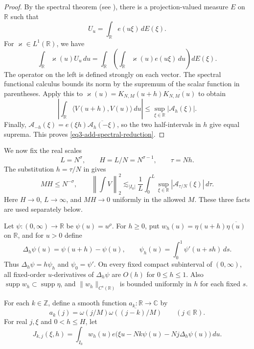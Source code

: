 \documentclass[reqno,12pt]{amsart}
\def \C {\mathbb C}
\def \Z {\mathbb Z}
\def \R {\mathbb R}
\def \Q {\mathbb Q}
\numberwithin{equation}{section}
\begin{document}
\begin{proof}
By the spectral theorem (see \cite[Theorem~4.45]{Folland2016}), there is a
projection-valued measure $E$ on $\R$ such that
$$U_u=\int_\R e(u\xi)\,dE(\xi).$$ For $\varkappa\in L^1(\R)$, we have
\[
 \int_\R\varkappa(u)U_u\,du
 =\int_\R\left(\int_\R\varkappa(u)e(u\xi)\,du\right)dE(\xi).
\]
The operator on the left is defined strongly on each vector. The
spectral functional calculus bounds its norm by the supremum of the
scalar function in parentheses. Apply this to
$\varkappa(u)=K_{N,M}(u+h)\overline{K_{N,M}(u)}$ to obtain
\[
 \left|\int_\R\langle V(u+h),V(u)\rangle\,du\right|
 \le\sup_{\xi\in\R}|\mathcal A_h(\xi)|.
\]
Finally,
$\mathcal A_{-h}(\xi)=e(\xi h)\overline{\mathcal A_h(-\xi)}$,
so the two half-intervals in $h$ give equal suprema.
This proves \eqref{eq3-add-spectral-reduction}.
\end{proof}

We now fix the real scales
\begin{equation}
 L=N^\sigma,\qquad H=L/N=N^{\sigma-1},\qquad \tau=Nh.
 \label{eq3-add-shift-scales}
\end{equation}
The substitution $h=\tau/N$ in  gives
\begin{equation}
 MH\le N^{-\sigma},\qquad
 \left\|\int V\right\|_2^2
 \lesssim_{|I_0|}\frac1L\int_0^L
       \sup_{\xi\in\R}|\mathcal A_{\tau/N}(\xi)|\,d\tau.
 \label{eq3-add-dual-time-reduction}
\end{equation}
Here $H\to0$, $L\to\infty$, and $MH\to0$ uniformly in the allowed
$M$. These three facts are used separately below.

Let $\psi:(0,\infty)\to\R$ be $\psi(u)=u^\rho$.
For $h\ge0$, put $w_h(u)=\eta(u+h)\overline{\eta(u)}$ on $\R$,
and for $u>0$ define
\begin{equation}
 \Delta_h\psi(u)=\psi(u+h)-\psi(u),\qquad
 \psi_h(u)=\int_0^1\psi'(u+sh)\,ds.
 \label{eq3-add-divided-difference}
\end{equation}
Thus $\Delta_h\psi=h\psi_h$ and $\psi_0=\psi'$.
On every fixed compact subinterval of $(0,\infty)$, all fixed-order
$u$-derivatives of $\Delta_h\psi$ are $O(h)$ for $0\le h\le1$.
Also $\operatorname{supp}w_h\subset\operatorname{supp}\eta$, and
$\|w_h\|_{C^s(\R)}$ is bounded uniformly in $h$ for each fixed $s$.

For each $k\in\Z$, define a smooth function $a_k:\R\to\C$ by
\[
 a_k(j)=\omega(j/M)\overline{\omega((j-k)/M)}\qquad(j\in\R).
\]
For real $j,\xi$ and $0<h\le H$, let
\begin{equation}
 J_{k,j}(\xi,h)=\int_{I_0}w_h(u)
 e\bigl(\xi u-Nk\psi(u)-Nj\Delta_h\psi(u)\bigr)\,du.
 \label{eq3-add-J}
\end{equation}
\end{document}
